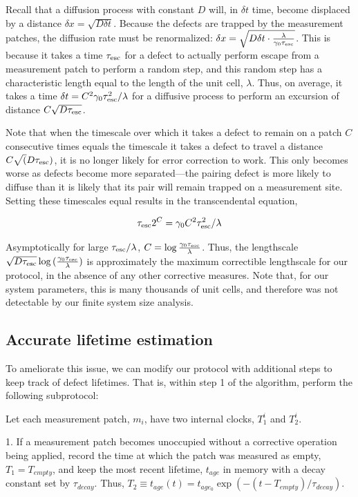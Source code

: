 \documentclass[twocolumn,superscriptaddress,aps,prb,floatfix]{revtex4-1}
\newcommand{\te}{\tau_{\rm{esc}}}
\begin{document}
Recall that a diffusion process with constant $D$ will, in $\delta t$ time, become displaced by a distance $\delta x = \sqrt{D \delta t}$.  Because the defects are trapped by the measurement patches, the diffusion rate must be renormalized: $\delta x = \sqrt{D \delta t \cdot \frac{\lambda}{\gamma_0 \te}}$.  This is because it takes a time $\te$ for a defect to actually perform escape from a measurement patch to perform a random step, and this random step has a characteristic length equal to the length of the unit cell, $\lambda$.  Thus, on average, it takes a time $\delta t = C^2 \gamma_0 \te^2 / \lambda$ for a diffusive process to perform an excursion of distance $C \sqrt{D \te}$.

Note that when the timescale over which it takes a defect to remain on a patch $C$ consecutive times equals the timescale it takes a defect to travel a distance $C \sqrt(D \te)$, it is no longer likely for error correction to work.  This only becomes worse as defects become more separated---the pairing defect is more likely to diffuse than it is likely that its pair will remain trapped on a measurement site.  Setting these timescales equal results in the transcendental equation,

\begin{equation}
\te 2^C = \gamma_0 C^2 \te^2 / \lambda
\end{equation}

Asymptotically for large $\te/\lambda$, $C=\log{\frac{\gamma_0\te}{\lambda}}$.  Thus, the lengthscale $\sqrt{D \te} \log{(\frac{\gamma_0\te}{\lambda})}$ is approximately the maximum correctible lengthscale for our protocol, in the absence of any other corrective measures.  Note that, for our system parameters, this is many thousands of unit cells, and therefore was not detectable by our finite system size analysis.

\subsection{Accurate lifetime estimation}

To ameliorate this issue, we can modify our protocol with additional steps to keep track of defect lifetimes.  That is, within step 1 of the algorithm, perform the following subprotocol:

Let each measurement patch, $m_i$, have two internal clocks, $T^i_1$ and $T^i_2$.

1. If a measurement patch becomes unoccupied without a corrective operation being applied, record the time at which the patch was measured as empty, $T_1=T_{empty}$, and keep the most recent lifetime, $t_{age}$ in memory with a decay constant set by $\tau_{decay}$.  Thus, $T_2 \equiv t_{age}(t) = t_{age_0}\exp(-(t-T_{empty})/\tau_{decay})$.
\end{document}
